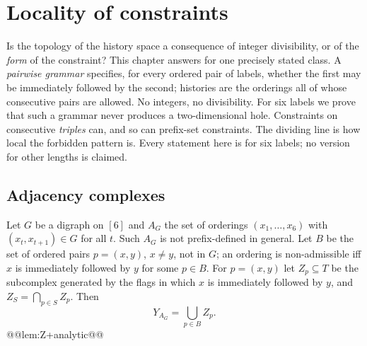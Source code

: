 \chapter{Locality of constraints}\label{ch:locality}

Is the topology of the history space a consequence of integer divisibility, or of the \emph{form} of the constraint? This chapter answers for one precisely stated class. A \emph{pairwise grammar} specifies, for every ordered pair of labels, whether the first may be immediately followed by the second; histories are the orderings all of whose consecutive pairs are allowed. No integers, no divisibility. For six labels we prove that such a grammar never produces a two-dimensional hole. Constraints on consecutive \emph{triples} can, and so can prefix-set constraints. The dividing line is how local the forbidden pattern is. Every statement here is for six labels; no version for other lengths is claimed.

\section{Adjacency complexes}\label{sec:adjacency}
Let $G$ be a digraph on $[6]$ and $A_G$ the set of orderings $(x_1,\dots,x_6)$ with $(x_t,x_{t+1})\in G$ for all $t$. Such $A_G$ is not prefix-defined in general. Let $B$ be the set of ordered pairs $p=(x,y)$, $x\ne y$, not in $G$; an ordering is non-admissible iff $x$ is immediately followed by $y$ for some $p\in B$. For $p=(x,y)$ let $Z_p\subseteq T$ be the subcomplex generated by the flags in which $x$ is immediately followed by $y$, and $Z_S=\bigcap_{p\in S}Z_p$. Then
\[
Y_{A_G}=\bigcup_{p\in B}Z_p .
\]
@@lem:Z+analytic@@


